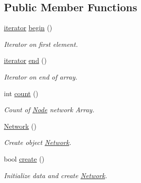 \subsection*{Public Member Functions}
\begin{DoxyCompactItemize}
\item 
\mbox{\label{classeven_1_1_network_af62d0c43a54de26a33fd56d751371a09}} 
\mbox{\hyperlink{classeven_1_1_network_a4ebb4f8991f810b68f2b98107752e0f3}{iterator}} \mbox{\hyperlink{classeven_1_1_network_af62d0c43a54de26a33fd56d751371a09}{begin}} ()
\begin{DoxyCompactList}\small\item\em Iterator on first element. \end{DoxyCompactList}\item 
\mbox{\label{classeven_1_1_network_a71b7400ea93daee628da020a971f77ca}} 
\mbox{\hyperlink{classeven_1_1_network_a4ebb4f8991f810b68f2b98107752e0f3}{iterator}} \mbox{\hyperlink{classeven_1_1_network_a71b7400ea93daee628da020a971f77ca}{end}} ()
\begin{DoxyCompactList}\small\item\em Iterator on end of array. \end{DoxyCompactList}\item 
\mbox{\label{classeven_1_1_network_a8eb9d046c93be29f1dd3478f32f2962e}} 
int \mbox{\hyperlink{classeven_1_1_network_a8eb9d046c93be29f1dd3478f32f2962e}{count}} ()
\begin{DoxyCompactList}\small\item\em Count of \mbox{\hyperlink{classeven_1_1_node}{Node}} network Array. \end{DoxyCompactList}\item 
\mbox{\hyperlink{classeven_1_1_network_a3cc2fb4f8fa4d507077e8da85ce5a1c8}{Network}} ()
\begin{DoxyCompactList}\small\item\em Create object \mbox{\hyperlink{classeven_1_1_network}{Network}}. \end{DoxyCompactList}\item 
\mbox{\label{classeven_1_1_network_a2ab40ac48d2a888bf7c2c0934ea56b70}} 
bool \mbox{\hyperlink{classeven_1_1_network_a2ab40ac48d2a888bf7c2c0934ea56b70}{create}} ()
\begin{DoxyCompactList}\small\item\em Initialize data and create \mbox{\hyperlink{classeven_1_1_network}{Network}}. \end{DoxyCompactList}\item 

\end{DoxyCompactItemize}
